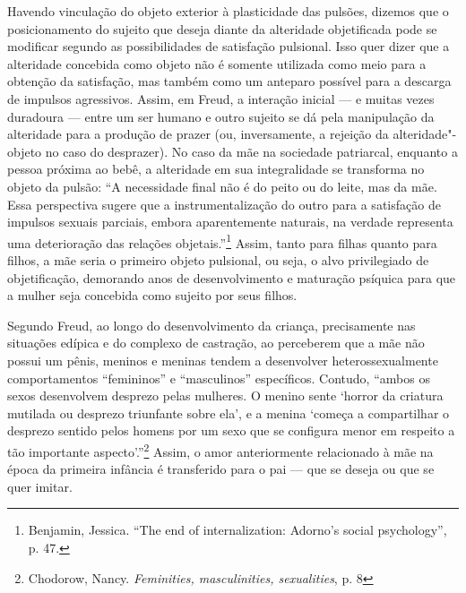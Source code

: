 Havendo vinculação do objeto exterior à plasticidade das pulsões,
dizemos que o posicionamento do sujeito que deseja diante da alteridade
objetificada pode se modificar segundo as possibilidades de satisfação
pulsional. Isso quer dizer que a alteridade concebida como objeto não é
somente utilizada como meio para a obtenção da satisfação, mas também
como um anteparo possível para a descarga de impulsos agressivos. Assim,
em Freud, a interação inicial --- e muitas vezes duradoura --- entre um
ser humano e outro sujeito se dá pela manipulação da alteridade para a
produção de prazer (ou, inversamente, a rejeição da alteridade"-objeto no
caso do desprazer). No caso da mãe na sociedade patriarcal, enquanto a
pessoa próxima ao bebê, a alteridade em sua integralidade se transforma
no objeto da pulsão: ``A necessidade final não é do peito ou do leite,
mas da mãe. Essa perspectiva sugere que a instrumentalização do outro
para a satisfação de impulsos sexuais parciais, embora aparentemente
naturais, na verdade representa uma deterioração das relações
objetais.''\footnote{Benjamin, Jessica. ``The end of internalization:
  Adorno's social psychology'', p. 47.} Assim, tanto para filhas quanto
para filhos, a mãe seria o primeiro objeto pulsional, ou seja, o alvo
privilegiado de objetificação, demorando anos de desenvolvimento e
maturação psíquica para que a mulher seja concebida como sujeito por
seus filhos.

Segundo Freud, ao longo do desenvolvimento da criança, precisamente nas
situações edípica e do complexo de castração, ao perceberem que a mãe
não possui um pênis, meninos e meninas tendem a desenvolver
heterossexualmente comportamentos ``femininos'' e ``masculinos''
específicos. Contudo, ``ambos os sexos desenvolvem desprezo pelas
mulheres. O menino sente `horror da criatura mutilada ou desprezo
triunfante sobre ela', e a menina `começa a compartilhar o desprezo
sentido pelos homens por um sexo que se configura menor em respeito a
tão importante aspecto'.''\footnote{Chodorow, Nancy. \emph{Feminities,
  masculinities, sexualities}, p. 8} Assim, o amor anteriormente
relacionado à mãe na época da primeira infância é transferido para o pai
--- que se deseja ou que se quer imitar.

